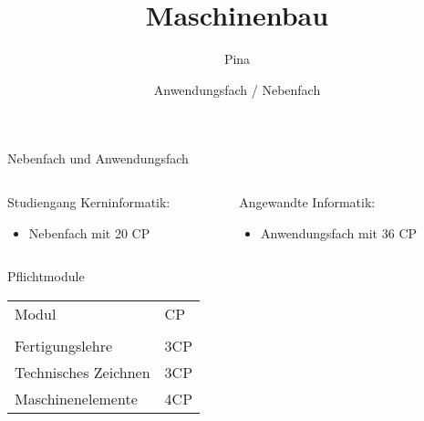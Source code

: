 \documentclass[11pt]{beamer}
\title[Anwendungsfach / Nebenfach: Maschinenbau] %
{Maschinenbau}
\author {Pina \faHandPeaceO}
\date[WiSe2021] %
{Anwendungsfach / Nebenfach}
\begin{document}
\begin{frame}
	\titlepage
\end{frame}













\begin{frame}{Nebenfach und Anwendungsfach}


\begin{columns}[T] %
\begin{column}{.48\textwidth}
\color{red}

Studiengang Kerninformatik: \\
\begin{itemize}
\item Nebenfach mit 20 CP
\end{itemize}


\end{column}%
\hfill%
\begin{column}{.48\textwidth}
\color{blue}


Angewandte Informatik: \\
\begin{itemize}
\item Anwendungsfach mit 36 CP
\end{itemize}


\end{column}%
\end{columns}
\end{frame}









\begin{frame}{Pflichtmodule}

\begin{tabular}{l l}

Modul & CP \\
& \\
Fertigungslehre & 3CP \\
Technisches Zeichnen & 3CP \\
Maschinenelemente & 4CP \\

\end{tabular}


\end{frame}
\end{document}
